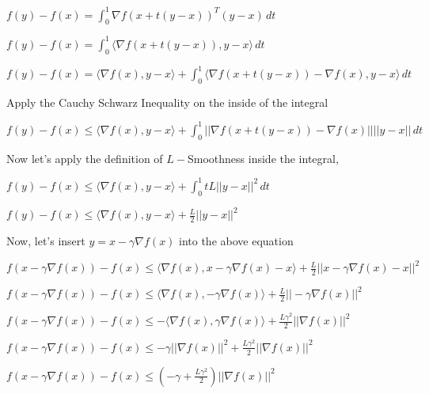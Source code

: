 $f(y) - f(x) = \int_{0}^{1} \nabla f(x + t(y - x))^T (y - x) \,dt$ \newline 

$f(y) - f(x) = \int_{0}^{1} \langle \nabla f(x + t(y - x)), y - x \rangle \,dt$ \newline 

$f(y) - f(x) = \langle \nabla f(x), y - x \rangle + \int_{0}^{1} \langle \nabla f(x + t(y - x)) - \nabla f(x), y - x \rangle \,dt$ \newline 

Apply the Cauchy Schwarz Inequality on the inside of the integral \newline 

$f(y) - f(x) \leq \langle \nabla f(x), y - x \rangle + \int_{0}^{1} ||\nabla f(x + t(y - x)) - \nabla f(x)|| || y - x || \,dt$ \newline 

Now let's apply the definition of $L-$Smoothness inside the integral, \newline 

$f(y) - f(x) \leq \langle \nabla f(x), y - x \rangle + \int_{0}^{1} tL ||y - x||^2\,dt$ \newline 

$f(y) - f(x) \leq \langle \nabla f(x), y - x \rangle + \frac{L}{2} ||y - x||^2$ \newline 


Now, let's insert $y = x - \gamma \nabla f(x)$ into the above equation \newline 

$f(x - \gamma \nabla f(x)) - f(x) \leq \langle \nabla f(x), x - \gamma \nabla f(x) - x \rangle + \frac{L}{2} ||x - \gamma \nabla f(x) - x||^2$ \newline 

$f(x - \gamma \nabla f(x)) - f(x) \leq \langle \nabla f(x), - \gamma \nabla f(x) \rangle + \frac{L}{2} ||- \gamma \nabla f(x)||^2$ \newline 

$f(x - \gamma \nabla f(x)) - f(x) \leq - \langle \nabla f(x), \gamma \nabla f(x) \rangle + \frac{L\gamma ^2}{2} ||\nabla f(x)||^2$ \newline 

$f(x - \gamma \nabla f(x)) - f(x) \leq - \gamma ||\nabla f(x)||^2 + \frac{L\gamma ^2}{2} ||\nabla f(x)||^2$ \newline 

$f(x - \gamma \nabla f(x)) - f(x) \leq (- \gamma + \frac{L\gamma ^2}{2}) ||\nabla f(x)||^2$ \newline 

